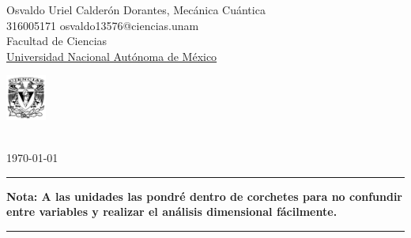 

\pagestyle{fancy}
\fancyhf{}
\makeatletter
\def\@seccntformat#1{%
  \expandafter\ifx\csname c@#1\endcsname\c@section\else
  \csname the#1\endcsname\quad
  \fi}
\makeatother

\begin{flushleft}
Osvaldo Uriel Calderón Dorantes, \hfill Mecánica Cuántica\\
316005171 \hfill osvaldo13576@ciencias.unam  \\
Facultad de Ciencias\\
\underline{Universidad Nacional Autónoma de México}
\end{flushleft}

\begin{flushright}\vspace{-5mm}
\includegraphics[height=1.5cm]{style/logo.pdf}
\end{flushright}
 
\begin{center}\vspace{-1cm}
\textbf{ \large {}}\\
\today
\end{center}
\medskip\hrule\medskip
{\small \textbf{Nota: A las unidades las pondré dentro de corchetes \ec{[\tx{unidad}]} para no confundir entre variables y realizar el análisis dimensional fácilmente.}}
\medskip\hrule\bigskip

